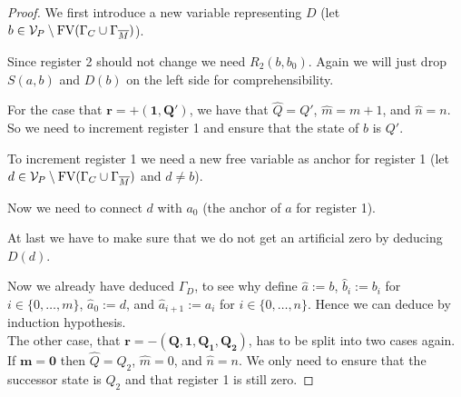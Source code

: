 \begin{proof}
	We first introduce a new variable representing $D$ (let $b\in \mathcal{V}_P\setminus\text{FV}(\Gamma_C\cup\Gamma_{\overline{M}})$).
	
	\begin{figure}[H]
		\centering
		
	\end{figure}
	Since register 2 should not change we need $R_2(b,b_0)$. Again we will just drop $S(a,b)$ and $D(b)$ on the left side for comprehensibility.
		
	\begin{figure}[H]
		\centering
		
	\end{figure}
	
	For the case that $\boldsymbol{r=+(1,Q')}$, we have that $\widehat{Q}=Q'$, $\widehat{m}=m+1$, and $\widehat{n}=n$. So we need to increment register 1 and ensure that the state of $b$ is $Q'$.
	\begin{figure}[H]
		\centering
		
	\end{figure}
	
	To increment register 1 we need a new free variable as anchor for register 1 (let $d\in\mathcal{V}_P\setminus\text{FV}(\Gamma_C\cup\Gamma_{\overline{M}})$ and $d\neq b$).
	
	\begin{figure}[H]
		\centering
		
	\end{figure}
	
	Now we need to connect $d$ with $a_0$ (the anchor of $a$ for register 1).
	
	\begin{figure}[H]
		\centering
		
	\end{figure}
	
	At last we have to make sure that we do not get an artificial zero by deducing $D(d)$.
	
	\begin{figure}[H]
		\centering
		
	\end{figure}
	
	Now we already have deduced $\Gamma_D$, to see why define $\widehat{a}:=b$, $\widehat{b}_i:=b_i$ for $i\in\{0,\dots,m\}$, $\widehat{a}_0:=d$, and $\widehat{a}_{i+1}:=a_i$ for $i\in\{0,\dots,n\}$.
	Hence we can deduce \false{} by induction hypothesis.\\
	
	The other case, that $\boldsymbol{r=-(Q,1,Q_1,Q_2)}$, has to be split into two cases again. If $\boldsymbol{m=0}$ then $\widehat{Q}=Q_2$, $\widehat{m}=0$, and $\widehat{n}=n$. We only need to ensure that the successor state is $Q_2$ and that register 1 is still zero.
	

\end{proof}

